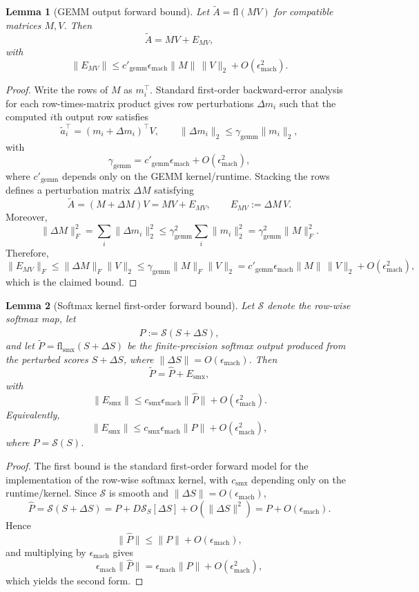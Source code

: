 \documentclass[twoside]{article}
\newtheorem{lemma}{Lemma}
\theoremstyle{definition}
\theoremstyle{remark}
\begin{document}
\begin{lemma}[GEMM output forward bound]
\label{lem:gemm-out}
Let $\widetilde{A}=\mathrm{fl}(MV)$ for compatible matrices $M,V$. Then
\[
\widetilde{A}=MV+E_{MV},
\]
with
\[
\|E_{MV}\|
\le
c'_{\mathrm{gemm}}\epsilon_{\mathrm{mach}}\|M\|\,\|V\|_2
+ O(\epsilon_{\mathrm{mach}}^2).
\]
\end{lemma}

\begin{proof}
Write the rows of $M$ as $m_i^\top$. Standard first-order backward-error
analysis for each row-times-matrix product gives row perturbations
$\Delta m_i$ such that the computed $i$th output row satisfies
\[
\widetilde a_i^\top
=
(m_i+\Delta m_i)^\top V,
\qquad
\|\Delta m_i\|_2
\le
\gamma_{\mathrm{gemm}}\|m_i\|_2,
\]
with
\[
\gamma_{\mathrm{gemm}}
=
c'_{\mathrm{gemm}}\epsilon_{\mathrm{mach}}
+ O(\epsilon_{\mathrm{mach}}^2),
\]
where $c'_{\mathrm{gemm}}$ depends only on the GEMM kernel/runtime. Stacking the
rows defines a perturbation matrix $\Delta M$ satisfying
\[
\widetilde A
=
(M+\Delta M)V
=
MV + E_{MV},
\qquad
E_{MV}:=\Delta M\,V.
\]
Moreover,
\[
\|\Delta M\|_F^2
=
\sum_i \|\Delta m_i\|_2^2
\le
\gamma_{\mathrm{gemm}}^2
\sum_i \|m_i\|_2^2
=
\gamma_{\mathrm{gemm}}^2\|M\|_F^2.
\]
Therefore,
\[
\|E_{MV}\|_F
\le
\|\Delta M\|_F\|V\|_2
\le
\gamma_{\mathrm{gemm}}\|M\|_F\|V\|_2
=
c'_{\mathrm{gemm}}\epsilon_{\mathrm{mach}}\|M\|\,\|V\|_2
+ O(\epsilon_{\mathrm{mach}}^2),
\]
which is the claimed bound.
\end{proof}

\begin{lemma}[Softmax kernel first-order forward bound]
\label{lem:softmax-kernel}
Let $\mathcal{S}$ denote the row-wise softmax map, let
\[
\widehat{P}:=\mathcal{S}(S+\Delta S),
\]
and let $\widetilde{P}=\mathrm{fl}_{\mathrm{smx}}(S+\Delta S)$ be the
finite-precision softmax output produced from the perturbed scores
$S+\Delta S$, where $\|\Delta S\|=O(\epsilon_{\mathrm{mach}})$. Then
\[
\widetilde{P}
=
\widehat{P}+E_{\mathrm{smx}},
\]
with
\[
\|E_{\mathrm{smx}}\|
\le
c_{\mathrm{smx}}\epsilon_{\mathrm{mach}}\|\widehat{P}\|
+ O(\epsilon_{\mathrm{mach}}^2).
\]
Equivalently,
\[
\|E_{\mathrm{smx}}\|
\le
c_{\mathrm{smx}}\epsilon_{\mathrm{mach}}\|P\|
+ O(\epsilon_{\mathrm{mach}}^2),
\]
where $P=\mathcal{S}(S)$.
\end{lemma}

\begin{proof}
The first bound is the standard first-order forward model for the
implementation of the row-wise softmax kernel, with
$c_{\mathrm{smx}}$ depending only on the runtime/kernel. Since
$\mathcal{S}$ is smooth and $\|\Delta S\|=O(\epsilon_{\mathrm{mach}})$,
\[
\widehat{P}
=
\mathcal{S}(S+\Delta S)
=
P + D\mathcal{S}_S[\Delta S] + O(\|\Delta S\|^2)
=
P + O(\epsilon_{\mathrm{mach}}).
\]
Hence
\[
\|\widehat{P}\|
\le
\|P\| + O(\epsilon_{\mathrm{mach}}),
\]
and multiplying by $\epsilon_{\mathrm{mach}}$ gives
\[
\epsilon_{\mathrm{mach}}\|\widehat{P}\|
=
\epsilon_{\mathrm{mach}}\|P\|
+ O(\epsilon_{\mathrm{mach}}^2),
\]
which yields the second form.
\end{proof}
\end{document}
